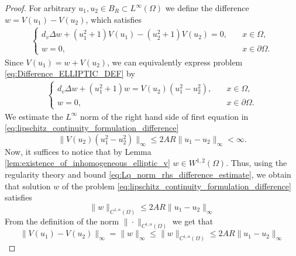 \documentclass[12pt, a4paper]{article}
\theoremstyle{break}
\theoremstyle{break}
\theoremstyle{break}
\theoremstyle{break}
\theoremstyle{break}
\theoremstyle{break}
\theoremstyle{break}
\begin{document}
\begin{proof}
    For arbitrary $u_1, u_2 \in B_R \subset L^\infty(\Omega)$ we define the difference $w = V(u_1) - V(u_2)$, which satisfies
    \begin{align}
        \label{eq:Difference_ELLIPTIC_DEF}
        \begin{cases}
            d_v\Delta w + (u_1^2 + 1) V(u_1) - (u_2^2 + 1) V(u_2) = 0, &\quad x \in \Omega, \\
            w = 0, &\quad x \in \partial\Omega.
        \end{cases}
    \end{align}
    Since $V(u_1) = w + V(u_2)$, we can equivalently express problem \eqref{eq:Difference_ELLIPTIC_DEF} by
    \begin{align}
        \label{eq:lipschitz_continuity_formulation_difference}
        \begin{cases}
            d_v\Delta w + (u_1^2 + 1) w  = V(u_2) (u_1^2 - u_2^2), &\quad x \in \Omega, \\
            w = 0, &\quad x \in \partial\Omega.
        \end{cases}
    \end{align}
    We estimate the $L^\infty$ norm of the right hand side of first equation in  \eqref{eq:lipschitz_continuity_formulation_difference}
    \begin{equation}
        \label{eq:Lq_norm_rhs_difference_estimate}
        \|V(u_2) (u_1^2-u_2^2)\|_\infty \leq 2AR\|u_1-u_2\|_\infty < \infty.
    \end{equation}
    Now, it suffices to notice that by Lemma \ref{lem:existence_of_inhomogeneous_elliptic_v} $w \in W^{1,2}(\Omega)$. Thus, using the regularity theory \cite[Theorem 8.34]{gilbarg2001elliptic} and bound \eqref{eq:Lq_norm_rhs_difference_estimate}, we obtain that solution $w$ of the problem \eqref{eq:lipschitz_continuity_formulation_difference} satisfies
    \begin{equation}
        \|w\|_{C^{1, \alpha}(\Omega)}  \leq 2AR\|u_1-u_2\|_\infty
    \end{equation}
    From the definition of the norm $\|\cdot\|_{C^{1,\alpha}(\Omega)}$ we get that
    \begin{equation}
        \|V(u_1) - V(u_2)\|_\infty = \|w\|_\infty \leq \|w\|_{C^{1, \alpha}(\Omega)}  \leq 2AR\|u_1-u_2\|_\infty
    \end{equation}
\end{proof}
\end{document}
